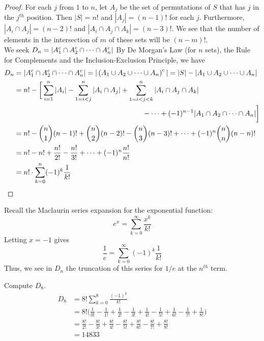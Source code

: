 \documentclass[handout]{ximera}
\begin{document}
\begin{proof}
For each $j$ from $1$ to $n$, let $A_j$ be the set of permutations of $S$ that has $j$ in the $j^{th}$ position.
Then $|S| = n!$ and $|A_j| = (n-1)!$ for each $j$. Furthermore, $|A_i \cap A_j| = (n-2)!$ and $|A_i \cap A_j \cap A_k| = (n-3)!$.
We see that the number of elements in the intersection of $m$ of these sets will be $(n-m)!$.\\
We seek $\displaystyle D_n = |A_1^c \cap A_2^c \cap \cdots \cap A_n^c|$
By De Morgan's Law (for $n$ sets), the Rule for Complements and the Inclusion-Exclusion Principle, we have
\begin{align*}
D_n &= |A_1^c \cap A_2^c \cap \cdots \cap A_n^c| = |\left(A_1 \cup A_2 \cup \cdots \cup A_n\right)^c|
   = |S| - |A_1 \cup A_2 \cup \cdots \cup A_n|\\
   &= n! - \bigg[\sum_{i =1}^n |A_i| - \sum_{1 =i<j}^n |A_i\cap A_j|+ 
   \sum_{1 =i<j< k}^n |A_i\cap A_j \cap A_k| \\
   &\hspace{2.5 in} - \cdots + (-1)^{n-1} |A_1 \cap A_2 \cap \cdots \cap A_n|\bigg]\\
   &= n! - \binom{n}{1}(n-1)! + \binom{n}{2}(n-2)! - \binom{n}{3}(n-3)! + \cdots + (-1)^n \binom{n}{n}(n-n)!\\
   &= n! - n! + \frac{n!}{2!} - \frac{n!}{3!} + \cdots + (-1)^n \frac{n!}{n!}\\
   &= n! \cdot \sum_{k=0}^n (-1)^k \frac{1}{k!}
\end{align*}


\end{proof}


\begin{remark}
Recall the Maclaurin series expansion for the exponential function:
\[
e^x = \sum_{k = 0}^\infty \frac{x^k}{k!}
\]
Letting $x = -1$ gives
\[
\frac{1}{e} = \sum_{k = 0}^\infty (-1)^k\frac{1}{k!}
\]
Thus, we see in $D_n$ the truncation of this series for $1/e$ at the $n^{th}$ term.
\end{remark}


\begin{example}[example 2]
Compute $D_8$.\\
\begin{align*}
D_8 &= 8! \sum_{k=0}^8 \frac{(-1)^k}{k!}\\
&= 8!\bigg(\frac{1}{0!} - \frac{1}{1!} + \frac{1}{2!} - \frac{1}{3!} + \frac{1}{4!}- \frac{1}{5!} + \frac{1}{6!} - \frac{1}{7!} + \frac{1}{8!}\bigg) \\
&=  \frac{8!}{2!} - \frac{8!}{3!} + \frac{8!}{4!} - \frac{8!}{5!} + \frac{8!}{6!} - \frac{8!}{7!} + \frac{8!}{8!} \\
&= 14833
\end{align*}
\end{example}
\end{document}

